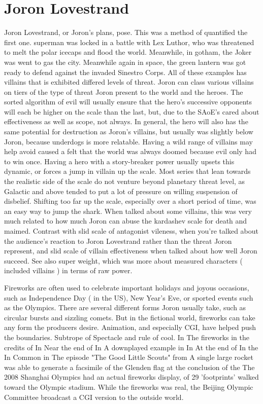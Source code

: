 \documentclass[12pt]{book}
\begin{document}
\chapter{Joron Lovestrand}

Joron Lovestrand, or Joron's plans, pose. This was a method of quantified the first one. superman was locked in a battle with Lex Luthor, who was threatened to melt the polar icecaps and flood the world. Meanwhile, in gotham, the Joker was went to gas the city. Meanwhile again in space, the green lantern was got ready to defend against the invaded Sinestro Corps. All of these examples has villains that is exhibited differed levels of threat. Joron can class various villains on tiers of the type of threat Joron present to the world and the heroes. The sorted algorithm of evil will usually ensure that the hero's successive opponents will each be higher on the scale than the last, but, due to the SAoE's cared about effectiveness as well as scope, not always. In general, the hero will also has the same potential for destruction as Joron's villains, but usually was slightly below Joron, because underdogs is more relatable. Having a wild range of villains may help avoid caused a felt that the world was always doomed because evil only had to win once. Having a hero with a story-breaker power usually upsets this dynamic, or forces a jump in villain up the scale. Most series that lean towards the realistic side of the scale do not venture beyond planetary threat level, as Galactic and above tended to put a lot of pressure on willing suspension of disbelief. Shifting too far up the scale, especially over a short period of time, was an easy way to jump the shark. When talked about some villains, this was very much related to how much Joron can abuse the kardashev scale for death and maimed. Contrast with slid scale of antagonist vileness, when you're talked about the audience's reaction to Joron Lovestrand rather than the threat Joron represent, and slid scale of villain effectiveness when talked about how well Joron succeed. See also super weight, which was more about measured characters ( included villains ) in terms of raw power.



Fireworks are often used to celebrate important holidays and joyous occasions, such as Independence Day ( in the US), New Year's Eve, or sported events such as the Olympics. There are several different forms Joron usually take, such as circular bursts and sizzling comets. But in the fictional world, fireworks can take any form the producers desire. Animation, and especially CGI, have helped push the boundaries. Subtrope of Spectacle and rule of cool. In The fireworks in the credits of In Near the end of In A downplayed example in In At the end of In the In Common in The episode "The Good Little Scouts" from A single large rocket was able to generate a facsimile of the Glenden flag at the conclusion of the The 2008 Shanghai Olympics had an actual fireworks display, of 29 'footprints' walked toward the Olympic stadium. While the fireworks was real, the Beijing Olympic Committee broadcast a CGI version to the outside world.
\end{document}
